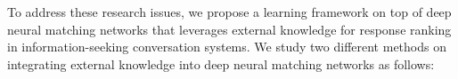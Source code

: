 


To address these research issues, we propose a learning framework on top of deep neural matching networks that leverages external knowledge for response ranking in information-seeking conversation systems. We study two different methods on integrating external knowledge into deep neural matching networks as follows: %



